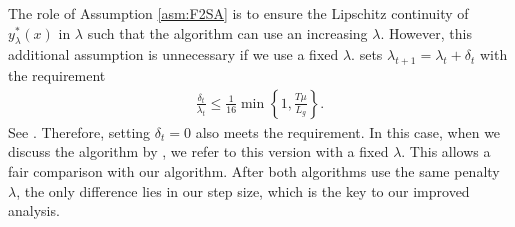 The role of Assumption \ref{asm:F2SA} is to ensure the Lipschitz continuity of $y_{\lambda}^*(x)$ in $\lambda$ such that the algorithm can use an increasing $\lambda$. 
However, this additional assumption is unnecessary if we use a fixed $\lambda$. \citet{kwon2023fully} sets $\lambda_{t+1} = \lambda_t + \delta_t$ with the requirement 
\begin{align*}
    \frac{\delta_t}{\lambda_t} \le \frac{1}{16} \min \left\{1, \frac{T \mu}{L_g} \right\}.
\end{align*}
See \citep[Theorem 4, Condition (3b)]{kwon2023fully}. Therefore, setting $\delta_t = 0$ also meets the requirement.
In this case, when we discuss the algorithm by \citet{kwon2023fully}, we refer to this version with a fixed $\lambda$. This allows a fair comparison with our algorithm. After both algorithms use the same penalty $\lambda$, the only difference lies in our step size, which is the key to our improved analysis.








